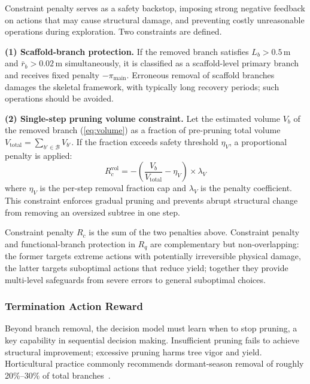 \documentclass[12pt,a4paper,fontset=fandol]{ctexart}
\newcommand{\rb}{\bar{r}_b}
\begin{document}
Constraint penalty serves as a safety backstop,
imposing strong negative feedback on actions that may cause structural damage,
and preventing costly unreasonable operations during exploration.
Two constraints are defined.

\textbf{(1) Scaffold-branch protection.}
If the removed branch satisfies $L_b > 0.5$\,m and $\rb > 0.02$\,m simultaneously,
it is classified as a scaffold-level primary branch and receives fixed penalty $-\pi_{\text{main}}$.
Erroneous removal of scaffold branches damages the skeletal framework,
with typically long recovery periods; such operations should be avoided.

\textbf{(2) Single-step pruning volume constraint.}
Let the estimated volume $V_b$ of the removed branch (\cref{eq:volume})
as a fraction of pre-pruning total volume $V_{\text{total}} = \sum_{b' \in \mathcal{B}} V_{b'}$.
If the fraction exceeds safety threshold $\eta_V$, a proportional penalty is applied:
\begin{equation}\label{eq:constraint}
  R_c^{\text{vol}} = -\left(\frac{V_b}{V_{\text{total}}} - \eta_V\right) \times \lambda_V
\end{equation}
where $\eta_V$ is the per-step removal fraction cap and $\lambda_V$ is the penalty coefficient.
This constraint enforces gradual pruning
and prevents abrupt structural change from removing an oversized subtree in one step.

Constraint penalty $R_c$ is the sum of the two penalties above.
Constraint penalty and functional-branch protection in $R_q$ are complementary but non-overlapping:
the former targets extreme actions with potentially irreversible physical damage,
the latter targets suboptimal actions that reduce yield;
together they provide multi-level safeguards from severe errors to general suboptimal choices.

\subsubsection{Termination Action Reward}

Beyond branch removal, the decision model must learn when to stop pruning, a key capability in sequential decision making.
Insufficient pruning fails to achieve structural improvement;
excessive pruning harms tree vigor and yield.
Horticultural practice commonly recommends dormant-season removal of roughly
20\%--30\% of total branches~\citep{he2018review}.
\end{document}
